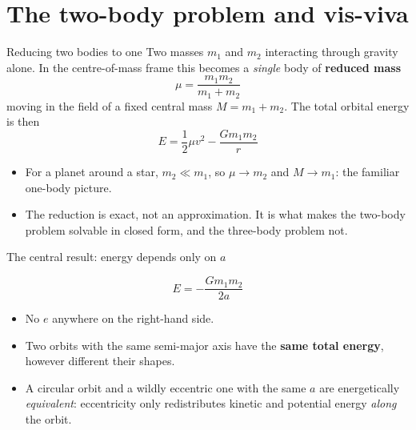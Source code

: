 \documentclass[aspectratio=169, 11pt]{beamer}
\begin{document}
\section{The two-body problem and vis-viva}

\begin{frame}{Reducing two bodies to one}
  Two masses $m_1$ and $m_2$ interacting through gravity alone. In the centre-of-mass frame this becomes a \emph{single} body of \textbf{reduced mass}
  \[
    \mu = \frac{m_1 m_2}{m_1 + m_2}
  \]
  moving in the field of a fixed central mass $M = m_1 + m_2$.
  \vskip6pt\relax
  The total orbital energy is then
  \[
    E = \frac{1}{2}\mu v^2 - \frac{G m_1 m_2}{r}
  \]
  \vskip4pt\relax
  \begin{itemize}
    \item For a planet around a star, $m_2 \ll m_1$, so $\mu \to m_2$ and $M \to m_1$: the familiar one-body picture.
    \item The reduction is exact, not an approximation. It is what makes the two-body problem solvable in closed form, and the three-body problem not.
  \end{itemize}
\end{frame}

\begin{frame}{The central result: energy depends only on $a$}
  \begin{center}
    \[
      \boxed{\;E = -\frac{G m_1 m_2}{2a}\;}
    \]
  \end{center}
  \vskip8pt\relax
  \begin{itemize}
    \item No $e$ anywhere on the right-hand side.
    \item Two orbits with the same semi-major axis have the \textbf{same total energy}, however different their shapes.
    \item A circular orbit and a wildly eccentric one with the same $a$ are energetically \emph{equivalent}: eccentricity only redistributes kinetic and potential energy \emph{along} the orbit.
  \end{itemize}
  \vskip8pt\relax
\end{frame}
\end{document}
